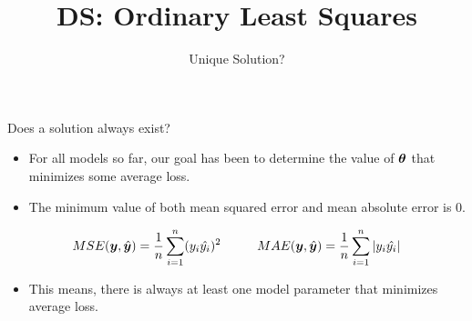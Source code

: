 \documentclass[aspectratio=169]{../latex_main/tntbeamer}  %
\title[Regression]{DS: Ordinary Least Squares}
\subtitle{Unique Solution?}
\begin{document}
	
	\maketitle
	\begin{frame}{Does a solution always exist?}
	    \begin{itemize}
	        \item For all models so far, our goal has been to determine the value of $\bm{\bm{\theta}}$ that minimizes some average loss.
	        \item The minimum value of both mean squared error and mean absolute error is 0.
	    \end{itemize}
	    \begin{equation*}
	        MSE(\bm{y},\hat{\bm{y}}) = \frac{1}{n}\sum\limits_{i=1}^n(y_i \hat{y_i})^2 \hspace{1cm} MAE(\bm{y},\hat{\bm{y}}) = \frac{1}{n}\sum\limits_{i=1}^n|y_i \hat{y_i}|
	    \end{equation*}
	    
	    \begin{itemize}
	        \item This means, there is always at least one model parameter that minimizes average loss.
	    \end{itemize}
	\end{frame}
	
	
	
\end{document}
